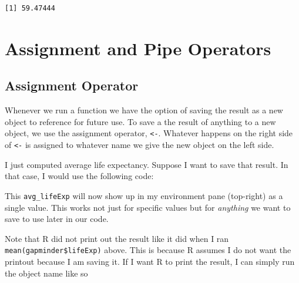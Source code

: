 \documentclass[
]{book}
\makeatletter
\newenvironment{Shaded}{\begin{snugshade}}{\end{snugshade}}
\newcommand{\FunctionTok}[1]{\textcolor[rgb]{0,0,0}{#1}}
\newcommand{\NormalTok}[1]{#1}
\newcommand{\OtherTok}[1]{\textcolor[rgb]{0.37,0.37,0.37}{#1}}
\newcommand{\SpecialCharTok}[1]{\textcolor[rgb]{0,0,0}{#1}}
\newenvironment{kframe}{%
\medskip{}
\setlength{\fboxsep}{.8em}
 \def\at@end@of@kframe{}%
 \ifinner\ifhmode%
  \def\at@end@of@kframe{\end{minipage}}%
  \begin{minipage}{\columnwidth}%
 \fi\fi%
 \def\FrameCommand##1{\hskip\@totalleftmargin \hskip-\fboxsep
 \colorbox{shadecolor}{##1}\hskip-\fboxsep
     \hskip-\linewidth \hskip-\@totalleftmargin \hskip\columnwidth}%
 \MakeFramed {\advance\hsize-\width
   \@totalleftmargin\z@ \linewidth\hsize
   \@setminipage}}%
 {\par\unskip\endMakeFramed%
 \at@end@of@kframe}
\renewenvironment{Shaded}{\begin{kframe}}{\end{kframe}}
\makeatother
\begin{document}
\begin{Shaded}
\end{Shaded}

\begin{verbatim}
[1] 59.47444
\end{verbatim}

\hypertarget{assignment-and-pipe-operators}{%
\section{Assignment and Pipe Operators}\label{assignment-and-pipe-operators}}

\hypertarget{assignment-operator}{%
\subsection{Assignment Operator}\label{assignment-operator}}

Whenever we run a function we have the option of saving the result as a new object to reference for future use. To save a the result of anything to a new object, we use the assignment operator, \texttt{\textless{}-}. Whatever happens on the right side of \texttt{\textless{}-} is assigned to whatever name we give the new object on the left side.

I just computed average life expectancy. Suppose I want to save that result. In that case, I would use the following code:

\begin{Shaded}
\end{Shaded}

This \texttt{avg\_lifeExp} will now show up in my environment pane (top-right) as a single value. This works not just for specific values but for \emph{anything} we want to save to use later in our code.

Note that R did not print out the result like it did when I ran \texttt{mean(gapminder\$lifeExp)} above. This is because R assumes I do not want the printout because I am saving it. If I want R to print the result, I can simply run the object name like so
\end{document}
